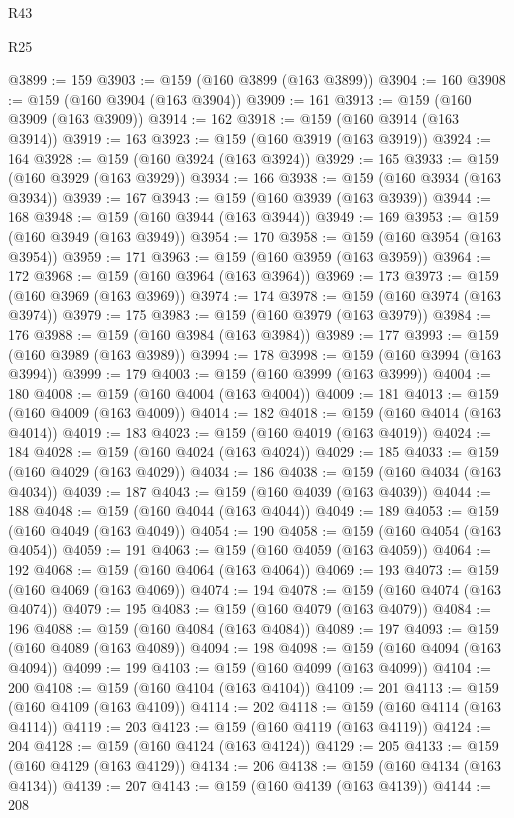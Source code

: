 \begin{lexlean}{R43}
\begin{lexlean}{R25}
\begin{coremodule}
{{{{{{{{{{{{{{{{{{{{{{{{{{{{{{{{{{{{{{{{{{{{{{{{{{{{{{{{{{{{{{{{{{{{{{{{{{{{{{{{{{{{{{{{{{{{{{{{{{{{{{{{{{{{{{{{{{{{{{{{{{{{{{{{{{{{{{{{{{{{{{{{{{{{{{{{{{{{{{{{{{{{{{{{{{{{{{{{{{{{{{{{{{{{{{{{{@3899 := 159
@3903 := @159 (@160 @3899 (@163 @3899))
@3904 := 160
@3908 := @159 (@160 @3904 (@163 @3904))
@3909 := 161
@3913 := @159 (@160 @3909 (@163 @3909))
@3914 := 162
@3918 := @159 (@160 @3914 (@163 @3914))
@3919 := 163
@3923 := @159 (@160 @3919 (@163 @3919))
@3924 := 164
@3928 := @159 (@160 @3924 (@163 @3924))
@3929 := 165
@3933 := @159 (@160 @3929 (@163 @3929))
@3934 := 166
@3938 := @159 (@160 @3934 (@163 @3934))
@3939 := 167
@3943 := @159 (@160 @3939 (@163 @3939))
@3944 := 168
@3948 := @159 (@160 @3944 (@163 @3944))
@3949 := 169
@3953 := @159 (@160 @3949 (@163 @3949))
@3954 := 170
@3958 := @159 (@160 @3954 (@163 @3954))
@3959 := 171
@3963 := @159 (@160 @3959 (@163 @3959))
@3964 := 172
@3968 := @159 (@160 @3964 (@163 @3964))
@3969 := 173
@3973 := @159 (@160 @3969 (@163 @3969))
@3974 := 174
@3978 := @159 (@160 @3974 (@163 @3974))
@3979 := 175
@3983 := @159 (@160 @3979 (@163 @3979))
@3984 := 176
@3988 := @159 (@160 @3984 (@163 @3984))
@3989 := 177
@3993 := @159 (@160 @3989 (@163 @3989))
@3994 := 178
@3998 := @159 (@160 @3994 (@163 @3994))
@3999 := 179
@4003 := @159 (@160 @3999 (@163 @3999))
@4004 := 180
@4008 := @159 (@160 @4004 (@163 @4004))
@4009 := 181
@4013 := @159 (@160 @4009 (@163 @4009))
@4014 := 182
@4018 := @159 (@160 @4014 (@163 @4014))
@4019 := 183
@4023 := @159 (@160 @4019 (@163 @4019))
@4024 := 184
@4028 := @159 (@160 @4024 (@163 @4024))
@4029 := 185
@4033 := @159 (@160 @4029 (@163 @4029))
@4034 := 186
@4038 := @159 (@160 @4034 (@163 @4034))
@4039 := 187
@4043 := @159 (@160 @4039 (@163 @4039))
@4044 := 188
@4048 := @159 (@160 @4044 (@163 @4044))
@4049 := 189
@4053 := @159 (@160 @4049 (@163 @4049))
@4054 := 190
@4058 := @159 (@160 @4054 (@163 @4054))
@4059 := 191
@4063 := @159 (@160 @4059 (@163 @4059))
@4064 := 192
@4068 := @159 (@160 @4064 (@163 @4064))
@4069 := 193
@4073 := @159 (@160 @4069 (@163 @4069))
@4074 := 194
@4078 := @159 (@160 @4074 (@163 @4074))
@4079 := 195
@4083 := @159 (@160 @4079 (@163 @4079))
@4084 := 196
@4088 := @159 (@160 @4084 (@163 @4084))
@4089 := 197
@4093 := @159 (@160 @4089 (@163 @4089))
@4094 := 198
@4098 := @159 (@160 @4094 (@163 @4094))
@4099 := 199
@4103 := @159 (@160 @4099 (@163 @4099))
@4104 := 200
@4108 := @159 (@160 @4104 (@163 @4104))
@4109 := 201
@4113 := @159 (@160 @4109 (@163 @4109))
@4114 := 202
@4118 := @159 (@160 @4114 (@163 @4114))
@4119 := 203
@4123 := @159 (@160 @4119 (@163 @4119))
@4124 := 204
@4128 := @159 (@160 @4124 (@163 @4124))
@4129 := 205
@4133 := @159 (@160 @4129 (@163 @4129))
@4134 := 206
@4138 := @159 (@160 @4134 (@163 @4134))
@4139 := 207
@4143 := @159 (@160 @4139 (@163 @4139))
@4144 := 208
}}}}}}}}}}}}}}}}}}}}}}}}}}}}}}}}}}}}}}}}}}}}}}}}}}}}}}}}}}}}}}}}}}}}}}}}}}}}}}}}}}}}}}}}}}}}}}}}}}}}}}}}}}}}}}}}}}}}}}}}}}}}}}}}}}}}}}}}}}}}}}}}}}}}}}}}}}}}}}}}}}}}}}}}}}}}}}}}}}}}}}}}}}}}}}}}}
\end{coremodule}
\end{lexlean}
\end{lexlean}

